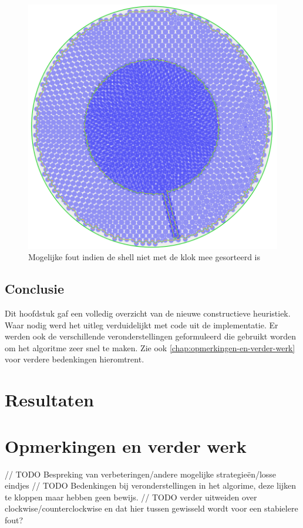 \documentclass[12pt,a4paper,oneside]{book}
\begin{document}
\begin{figure}
  \centering
  \includegraphics[width=.65\textwidth]{plaats-op-shell-hoek-fout.png}
  \caption{Mogelijke fout indien de shell niet met de klok mee gesorteerd is} \label{fig:plaats-op-shell-hoek-fout} 
\end{figure}

\section{Conclusie}

Dit hoofdstuk gaf een volledig overzicht van de nieuwe constructieve heuristiek.
Waar nodig werd het uitleg verduidelijkt met code uit de implementatie.
Er werden ook de verschillende veronderstellingen geformuleerd die gebruikt worden om het algoritme zeer snel te maken.
Zie ook \autoref{chap:opmerkingen-en-verder-werk} voor verdere bedenkingen hieromtrent.

\chapter{Resultaten} \label{chap:resultaten}


\chapter{Opmerkingen en verder werk} \label{chap:opmerkingen-en-verder-werk}

// TODO Bespreking van verbeteringen/andere mogelijke strategieën/losse eindjes
// TODO Bedenkingen bij veronderstellingen in het algorime, deze lijken te kloppen maar hebben geen bewijs.
// TODO verder uitweiden over clockwise/counterclockwise en dat hier tussen gewisseld wordt voor een stabielere fout?
\end{document}
